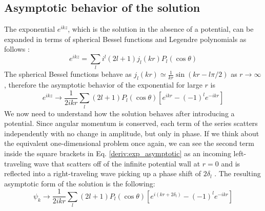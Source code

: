 \subsection{Asymptotic behavior of the solution}
The exponential \(e^{ikz} \), which is the solution in the absence of a potential, can be expanded in terms of spherical Bessel functions and Legendre polynomials as follows \cite{Cohen-Tannoudji}:
\begin{equation}
	e^{ikz} = \sum_{l} i^l (2l+1) j_l(kr)P_l(\cos \theta )
\end{equation}
The spherical Bessel functions behave as \(j_l(kr) \simeq \frac{1}{kr} \sin \left(kr - l \pi /2\right)\) as \(r \to \infty \), therefore the asymptotic behavior of the exponential for large \(r\) is
\begin{equation}\label{deriv:exp_asymptotic}
	e^{ikz} \to  \frac{1}{2ikr} \sum_{l} (2l+1) P_l (\cos \theta ) \left[ e^{ikr}  - (-1)^l e^{-ikr} \right]
\end{equation}
We now need to understand how the solution behaves after introducing a potential. Since angular momentum is conserved, each term of the series scatters independently with no change in amplitude, but only in phase. If we think about the equivalent one-dimensional problem once again, we can see the second term inside the square brackets in Eq. \eqref{deriv:exp_asymptotic} as an incoming left-traveling wave that scatters off of the infinite potential wall at \(r=0\) and is reflected into a right-traveling wave picking up a phase shift of \(2\delta _l\) \cite{Griffiths}. The resulting asymptotic form of the solution is the following:
\begin{equation}\label{deriv:sol_asymptotic}
	\psi_k \to \frac{1}{2ikr}\sum_{l} (2l+1)P_l(\cos \theta )\left[e^{i(kr+2\delta _l)}- (-1)^l e^{-ikr}  \right]
\end{equation}

